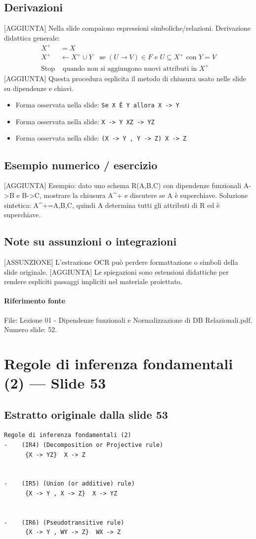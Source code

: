 \documentclass[11pt]{article}
\begin{document}
\subsection*{Derivazioni}
[AGGIUNTA] Nella slide compaiono espressioni simboliche/relazioni. Derivazione didattica generale:
\begin{align*}
X^+ &= X \\
X^+ &\leftarrow X^+ \cup Y \quad \text{se } (U \to V) \in F \text{ e } U \subseteq X^+ \text{ con } Y=V \\
\text{Stop} &\text{ quando non si aggiungono nuovi attributi in } X^+
\end{align*}
[AGGIUNTA] Questa procedura esplicita il metodo di chiusura usato nelle slide su dipendenze e chiavi.
\begin{itemize}[leftmargin=*]
\item Forma osservata nella slide: \texttt{Se X Ê Y allora X -> Y}
\item Forma osservata nella slide: \texttt{X -> Y  XZ -> YZ}
\item Forma osservata nella slide: \texttt{(X -> Y , Y -> Z)  X -> Z}
\end{itemize}
\subsection*{Esempio numerico / esercizio}
[AGGIUNTA] Esempio: dato uno schema R(A,B,C) con dipendenze funzionali A->B e B->C, mostrare la chiusura A^+ e discutere se A è superchiave. Soluzione sintetica: A^+={A,B,C}, quindi A determina tutti gli attributi di R ed è superchiave.
\subsection*{Note su assunzioni o integrazioni}
[ASSUNZIONE] L'estrazione OCR può perdere formattazione o simboli della slide originale.
[AGGIUNTA] Le spiegazioni sono estensioni didattiche per rendere espliciti passaggi impliciti nel materiale proiettato.
\paragraph{Riferimento fonte} File: Lezione 01 - Dipendenze funzionali e Normalizzazione di DB Relazionali.pdf. Numero slide: 52.
\section{Regole di inferenza fondamentali (2) --- Slide 53}
\subsection*{Estratto originale dalla slide 53}
\begin{lstlisting}
Regole di inferenza fondamentali (2)
-    (IR4) (Decomposition or Projective rule)
      {X -> YZ}  X -> Z


-    (IR5) (Union (or additive) rule)
      {X -> Y , X -> Z}  X -> YZ


-    (IR6) (Pseudotransitive rule)
      {X -> Y , WY -> Z}  WX -> Z
\end{lstlisting}
\end{document}
